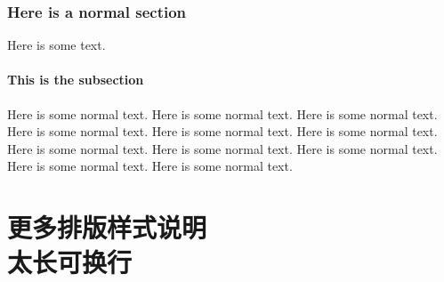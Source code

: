 \documentclass{WileySev}
\begin{document}
\section{Here is a normal section}
Here is some text.

\subsection{This is the subsection}
Here is some normal text.
Here is some normal text.
Here is some normal text.
Here is some normal text.
Here is some normal text.
Here is some normal text.
Here is some normal text.
Here is some normal text.
Here is some normal text.
Here is some normal text.
Here is some normal text.






\part[更多排版样式说明]
{更多排版样式说明\\ 太长可换行}
\end{document}
